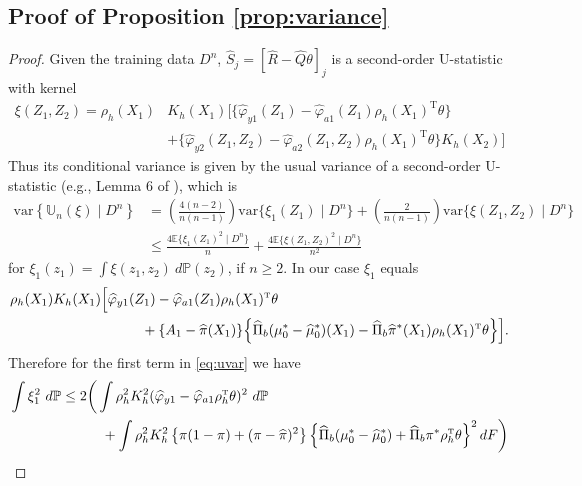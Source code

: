 \documentclass[11pt,twoside]{article}
\def\T{{ \mathrm{\scriptscriptstyle T} }}
\newcommand{\var}{\text{var}}
\newcommand{\Pb}{\mathbb{P}}
\newcommand{\Un}{\mathbb{U}_n}
\newcommand{\E}{\mathbb{E}}
\theoremstyle{definition}
\theoremstyle{remark}
\begin{document}
\bigskip

\subsection{Proof of Proposition \ref{prop:variance}}
\label{app:propvariance}

\begin{proof}
Given the training data $D^n$,  $\widehat{S}_j=[\widehat{R}-\widehat{Q} \theta]_j$ is a second-order U-statistic with kernel
\begin{align*}
\xi(Z_1,Z_2) =  \rho_h(X_1) & K_h(X_1) \Big[ \Big\{ \widehat\varphi_{y1}(Z_1) -  \widehat\varphi_{a1}(Z_1)  \rho_h(X_1)^\T \theta \Big\} \\
& +  \Big\{ \widehat\varphi_{y2}(Z_1,Z_2)- \widehat\varphi_{a2}(Z_1,Z_2) \rho_h(X_1)^\T \theta \Big\} K_h(X_2) \Big]
\end{align*}
Thus its conditional variance is given by the usual variance of a second-order U-statistic (e.g., Lemma 6 of \citet{robins2009quadratic}), which is
\begin{align}
\var\left\{ \Un(\xi) \mid D^n \right\} %
&= \left( \frac{4(n-2)}{n(n-1)} \right) \var\{ \xi_1(Z_1)\mid D^n \} + \left( \frac{2}{n(n-1)} \right) \var\{ \xi(Z_1,Z_2) \mid D^n \}  \nonumber \\
&\leq  \frac{4 \E\{ \xi_1(Z_1)^2 \mid D^n \}}{n}  + \frac{4\E\{ \xi(Z_1,Z_2)^2 \mid D^n \} }{n^2} \label{eq:uvar}
\end{align}
for $\xi_1(z_1) = \int \xi(z_1,z_2) \ d\Pb(z_2)$, if $n \geq 2$. In our case $\xi_1$ equals
\begin{align*}
\rho_h(X_1) K_h(X_1) &\Big[ \widehat\varphi_{y1}(Z_1)  -  \widehat\varphi_{a1}(Z_1)  \rho_h(X_1)^\T \theta \\
&\hspace{.4in} + \{A_1 - \widehat\pi(X_1)\} \Big\{ \widehat\Pi_{b}(\mu_0^*-\widehat\mu_0^*)(X_1) - \widehat\Pi_b \widehat\pi^*(X_1) \rho_h(X_1)^\T \theta \Big\} \Big] .
\end{align*}
Therefore for the first term in \eqref{eq:uvar} we have
\begin{align*}
\int \xi_1^2 \ d\Pb &\leq 2 \bigg( \int \rho_h^2 K_h^2 (\widehat\varphi_{y1} - \widehat\varphi_{a1} \rho_h^\T\theta)^2 \ d\Pb \\
& \hspace{.4in} + \int \rho_h^2 K_h^2 \left\{ \pi(1-\pi) + (\pi -\widehat\pi)^2 \right\} \left\{ \widehat\Pi_{b}(\mu_0^*-\widehat\mu_0^*) + \widehat\Pi_b \pi^* \rho_h^\T \theta \right\}^2  dF \bigg) \\

\end{align*}
\end{proof}
\end{document}
